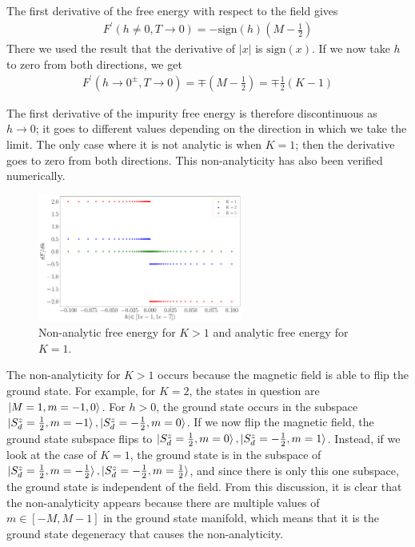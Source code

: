 \documentclass[12pt]{revtex4-2}
\begin{document}
The first derivative of the free energy with respect to the field gives
\begin{align}
	F^\prime(h\neq 0, T\to 0) = -\text{sign}(h)\left(M - \frac{1}{2}\right)
\end{align}
There we used the result that the derivative of \(|x|\) is \(\text{sign}(x)\). If we now take \(h\) to zero from both directions, we get
\begin{align}
	F^\prime(h \to 0^\pm, T\to 0) = \mp\left(M - \frac{1}{2}\right) = \mp \frac{1}{2}\left( K - 1 \right) 
\end{align}

The first derivative of the impurity free energy is therefore discontinuous as \(h\to 0\); it goes to different values depending on the direction in which we take the limit. The only case where it is not analytic is when \(K=1\); then the derivative goes to zero from both directions. This non-analyticity has also been verified numerically.
\begin{figure}[htpb]
	\centering
	\includegraphics[width=0.6\textwidth]{../numerics/disc_mag_global.pdf}
	\caption{Non-analytic free energy for \(K>1\) and analytic free energy for \(K=1\).}
\end{figure}

The non-analyticity for \(K>1\) occurs because the magnetic field is able to flip the ground state. For example, for \(K=2\), the states in question are \(\ket{M=1, m=-1,0}\). For \(h>0\), the ground state occurs in the subspace \(\ket{S_d^z=\frac{1}{2}, m=-1},\ket{S_d^z=-\frac{1}{2},m=0}\). If we now flip the magnetic field, the ground state subspace flips to \(\ket{S_d^z=\frac{1}{2}, m=0},\ket{S_d^z=-\frac{1}{2},m=1}\). Instead, if we look at the case of \(K=1\), the ground state is in the subspace of \(\ket{S_d^z=\frac{1}{2},m=-\frac{1}{2}},\ket{S_d^z=-\frac{1}{2}, m=\frac{1}{2}}\), and since there is only this one subspace, the ground state is independent of the field. From this discussion, it is clear that the non-analyticity appears because there are multiple values of \(m \in [-M, M-1]\) in the ground state manifold, which means that it is the ground state degeneracy that causes the non-analyticity.
\end{document}

